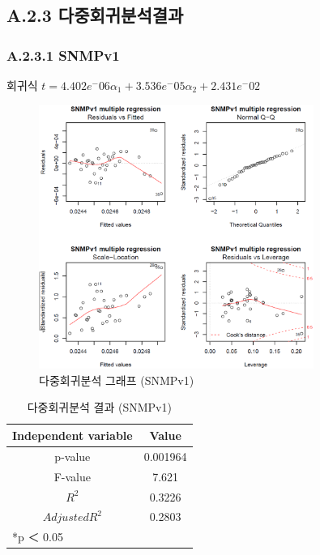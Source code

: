 \documentclass[11pt
  , a4paper
  , article
  , oneside
]{memoir}
\begin{document}
\clearpage
\subsection{A.2.3 다중회귀분석결과}
\subsubsection{A.2.3.1 SNMPv1}
\centering 회귀식 $ t=4.402e^-06\alpha_1 + 3.536e^-05\alpha_2 + 2.431e^-02$ 
   　
\begin{figure}[h!]
  \centering
  \includegraphics[width=0.8\textwidth]{./images/v1.eps}
  \caption{다중회귀분석 그래프 (SNMPv1)}
\end{figure}

\begin{table}[!h]
\begin{center}
\begin{tabular}{c|c}\hline
Independent variable & Value  \\ \hline\hline
p-value &  0.001964\\ 
F-value &  7.621\\ 
$  R^2  $ &  0.3226\\ 
$ Adjusted R^2 $ & 0.2803 \\ \hline
\multicolumn{2}{l}{*p ＜ 0.05} \\ \hline\hline
\end{tabular}
\caption{다중회귀분석 결과 (SNMPv1)}
\end{center}
\end{table} 
\clearpage
\end{document}
